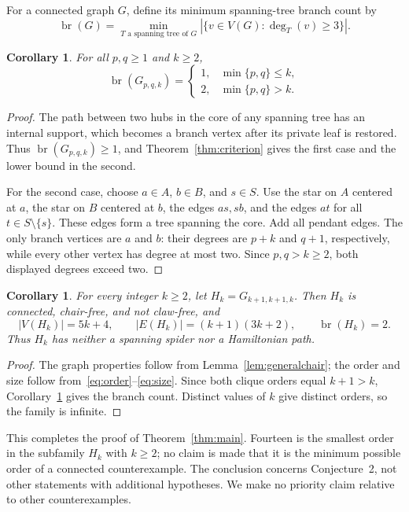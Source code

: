 \documentclass[11pt]{article}
\newtheorem{corollary}[theorem]{Corollary}
\theoremstyle{remark}
\newcommand{\br}{\operatorname{br}}
\newcommand{\degg}{\operatorname{deg}}
\begin{document}
For a connected graph $G$, define its minimum spanning-tree branch count by
\[
 \br(G)=\min_{T\text{ a spanning tree of }G}
        |\{v\in V(G):\degg_T(v)\geq3\}|.
\]

\begin{corollary}\label{cor:branchcount}
For all $p,q\geq1$ and $k\geq2$,
\[
 \br(G_{p,q,k})=
 \begin{cases}
  1,&\min\{p,q\}\leq k,\\
  2,&\min\{p,q\}>k.
 \end{cases}
\]
\end{corollary}
\begin{proof}
The path between two hubs in the core of any spanning tree has an internal support, which becomes a branch vertex after its private leaf is restored. Thus $\br(G_{p,q,k})\geq1$, and Theorem~\ref{thm:criterion} gives the first case and the lower bound in the second.

For the second case, choose $a\in A$, $b\in B$, and $s\in S$. Use the star on $A$ centered at $a$, the star on $B$ centered at $b$, the edges $as,sb$, and the edges $at$ for all $t\in S\setminus\{s\}$. These edges form a tree spanning the core. Add all pendant edges. The only branch vertices are $a$ and $b$: their degrees are $p+k$ and $q+1$, respectively, while every other vertex has degree at most two. Since $p,q>k\geq2$, both displayed degrees exceed two.
\end{proof}

\begin{corollary}\label{cor:infinite}
For every integer $k\geq2$, let $H_k=G_{k+1,k+1,k}$. Then $H_k$ is connected, chair-free, and not claw-free, and
\[
 |V(H_k)|=5k+4,\qquad
 |E(H_k)|=(k+1)(3k+2),\qquad
 \br(H_k)=2.
\]
Thus $H_k$ has neither a spanning spider nor a Hamiltonian path.
\end{corollary}
\begin{proof}
The graph properties follow from Lemma~\ref{lem:generalchair}; the order and size follow from~\eqref{eq:order}--\eqref{eq:size}. Since both clique orders equal $k+1>k$, Corollary~\ref{cor:branchcount} gives the branch count. Distinct values of $k$ give distinct orders, so the family is infinite.
\end{proof}

This completes the proof of Theorem~\ref{thm:main}. Fourteen is the smallest order in the subfamily $H_k$ with $k\geq2$; no claim is made that it is the minimum possible order of a connected counterexample. The conclusion concerns Conjecture~2, not other statements with additional hypotheses. We make no priority claim relative to other counterexamples.
\end{document}
